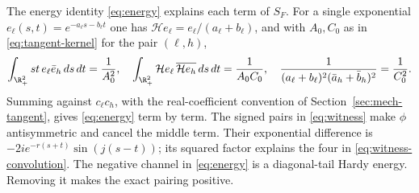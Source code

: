 The energy identity \eqref{eq:energy} explains each term of $S_F$. For a
single exponential $e_\ell(s,t)=e^{-a_\ell s-b_\ell t}$ one has
$\mathcal H e_\ell=e_\ell/(a_\ell+b_\ell)$, and with $A_0,C_0$ as in \eqref{eq:tangent-kernel}
for the pair $(\ell,h)$,
\begin{equation}
 \int_{\R_+^2}st\,e_\ell\bar e_h\,ds\,dt=\frac1{A_0^2},\quad
 \int_{\R_+^2}\mathcal H e_\ell\,\overline{\mathcal H e_h}\,ds\,dt=\frac1{A_0C_0},\quad
 \frac1{(a_\ell+b_\ell)^2(\bar a_h+\bar b_h)^2}=\frac1{C_0^2}.
                                                         \label{eq:exponential-integrals}
\end{equation}
Summing against $c_\ell c_h$, with the real-coefficient convention of
Section~\ref{sec:mech-tangent}, gives \eqref{eq:energy} term by term.
The signed pairs in \eqref{eq:witness} make $\phi$ antisymmetric and
cancel the middle term. Their exponential difference is
$-2i e^{-r(s+t)}\sin(j(s-t))$; its squared factor explains the four in
\eqref{eq:witness-convolution}. The negative channel in \eqref{eq:energy} is a
diagonal-tail Hardy energy. Removing it makes the exact pairing positive.
